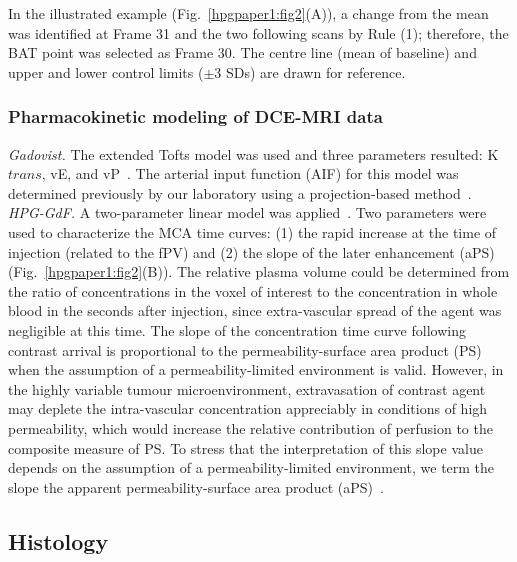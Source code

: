 In the illustrated example (Fig.~\ref{hpgpaper1:fig2}(A)), a change from the mean was identified at Frame 31 and the two following scans by Rule (1); therefore, the BAT point was selected as Frame 30.
The centre line (mean of baseline) and upper and lower control limits ($\pm$3 SDs) are drawn for reference.

\subsubsection{Pharmacokinetic modeling of DCE-MRI data}

\textit{Gadovist.} The extended Tofts model was used and three parameters resulted: K${trans}$, vE, and vP~\cite{Sourbron:2011ce}.
The arterial input function (AIF) for this model was determined previously by our laboratory using a projection-based method~\cite{Moroz:2013ee}.
\textit{HPG-GdF.} A two-parameter linear model was applied~\cite{Pathak:2005gu}.
Two parameters were used to characterize the \ac{MCA} time curves: (1) the rapid increase at the time of injection (related to the \ac{fPV}) and (2) the slope of the later enhancement (aPS) (Fig.~\ref{hpgpaper1:fig2}(B)).
The relative plasma volume could be determined from the ratio of concentrations in the voxel of interest to the concentration in whole blood in the seconds after injection, since extra-vascular spread of the agent was negligible at this time.
The slope of the concentration time curve following contrast arrival is proportional to the permeability-surface area product (PS) when the assumption of a permeability-limited environment is valid.
However, in the highly variable tumour microenvironment, extravasation of contrast agent may deplete the intra-vascular concentration appreciably in conditions of high permeability, which would increase the relative contribution of perfusion to the composite measure of PS.
To stress that the interpretation of this slope value depends on the assumption of a permeability-limited environment, we term the slope the apparent permeability-surface area product (aPS)~\cite{DaldrupLink:2004gy,Dafni:2002kb}.

\subsection{Histology}

